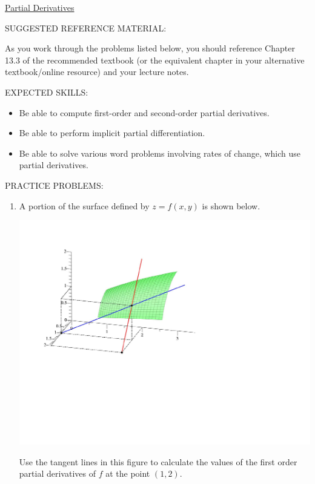 \documentclass[12pt]{article}
\newif\ifans
\begin{document}
\begin{center}
\underline{\LARGE{Partial Derivatives}}
\end{center}

\noindent SUGGESTED REFERENCE MATERIAL:

\bigskip

\noindent As you work through the problems listed below, you should reference Chapter 13.3 of the recommended textbook (or the equivalent chapter in your alternative textbook/online resource) and your lecture notes.

\bigskip

\noindent EXPECTED SKILLS:

\begin{itemize}

\item Be able to compute first-order and second-order partial derivatives. 

\item Be able to perform implicit partial differentiation. 

\item Be able to solve various word problems involving rates of change, which use partial derivatives.

\end{itemize}

\noindent PRACTICE PROBLEMS:

\medskip

\begin{enumerate}

\item A portion of the surface defined by $z=f(x,y)$ is shown below.

\begin{center}
\includegraphics[scale=0.6]{tangents2.pdf}
\end{center}

Use the tangent lines in this figure to calculate the values of the first order partial derivatives of $f$ at the point $(1,2)$.

\ifans{\fbox{$f_x(1,2)=-1$; $f_y(1,2)=\frac{1}{2}$}} \fi

\end{enumerate}
\end{document}
